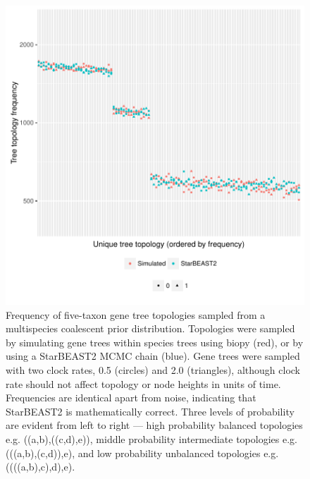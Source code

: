 \documentclass[12pt]{article}
\begin{document}
\clearpage

\begin{figure}[htb!]
\centering
\includegraphics[width=130mm]{gene_topology_frequencies.pdf}
\caption
{Frequency of five-taxon gene tree topologies sampled from a multispecies
coalescent prior distribution. Topologies were sampled by simulating gene trees
within species trees using biopy (red), or by using a StarBEAST2 MCMC chain
(blue). Gene trees were sampled with two clock rates, 0.5 (circles) and 2.0
(triangles), although clock rate should not affect topology or node heights in
units of time. Frequencies are identical apart from noise, indicating that
StarBEAST2 is mathematically correct. Three levels of probability are evident
from left to right --- high probability balanced topologies e.g.
((a,b),((c,d),e)), middle probability intermediate topologies e.g.
(((a,b),(c,d)),e), and low probability unbalanced topologies e.g.
((((a,b),c),d),e).}
\label{fig:geneTopologyFrequencies}
\end{figure}

\clearpage
\end{document}
